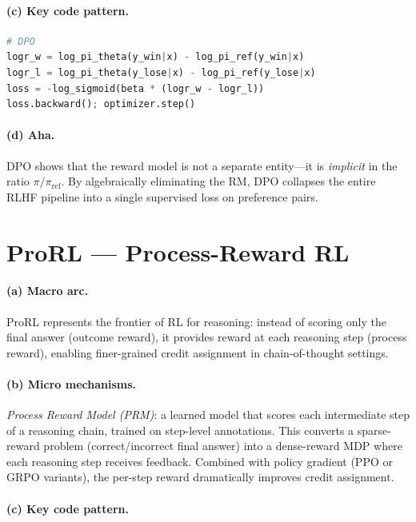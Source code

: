 \paragraph{(c) Key code pattern.}

\begin{lstlisting}[language=Python]
# DPO
logr_w = log_pi_theta(y_win|x) - log_pi_ref(y_win|x)
logr_l = log_pi_theta(y_lose|x) - log_pi_ref(y_lose|x)
loss = -log_sigmoid(beta * (logr_w - logr_l))
loss.backward(); optimizer.step()
\end{lstlisting}

\paragraph{(d) Aha.}
DPO shows that the reward model is not a separate entity---it is \emph{implicit} in the ratio $\pi/\pi_{\text{ref}}$.
By algebraically eliminating the RM, DPO collapses the entire RLHF pipeline into a single supervised loss on preference pairs.

\section{ProRL --- Process-Reward RL}
\label{sec:prorl}

\paragraph{(a) Macro arc.}
ProRL represents the frontier of RL for reasoning: instead of scoring only the final answer (outcome reward), it provides reward at each reasoning step (process reward), enabling finer-grained credit assignment in chain-of-thought settings.

\paragraph{(b) Micro mechanisms.}
\emph{Process Reward Model (PRM)}: a learned model that scores each intermediate step of a reasoning chain, trained on step-level annotations.
This converts a sparse-reward problem (correct/incorrect final answer) into a dense-reward MDP where each reasoning step receives feedback.
Combined with policy gradient (PPO or GRPO variants), the per-step reward dramatically improves credit assignment.

\paragraph{(c) Key code pattern.}

